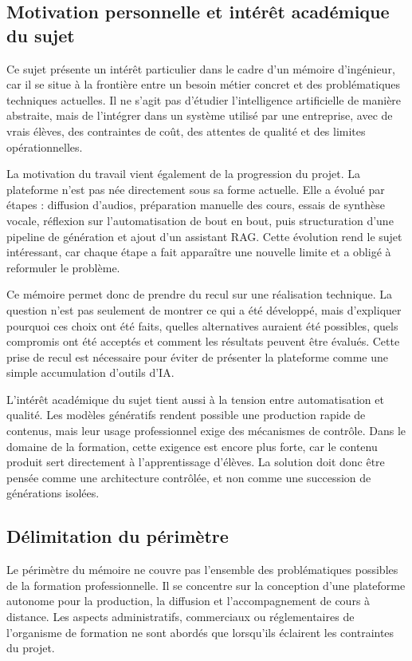 \subsection{Motivation personnelle et intérêt académique du sujet}

Ce sujet présente un intérêt particulier dans le cadre d'un mémoire d'ingénieur, car il se
situe à la frontière entre un besoin métier concret et des problématiques techniques
actuelles. Il ne s'agit pas d'étudier l'intelligence artificielle de manière abstraite, mais de
l'intégrer dans un système utilisé par une entreprise, avec de vrais élèves, des contraintes
de coût, des attentes de qualité et des limites opérationnelles.

La motivation du travail vient également de la progression du projet. La plateforme n'est
pas née directement sous sa forme actuelle. Elle a évolué par étapes : diffusion d'audios,
préparation manuelle des cours, essais de synthèse vocale, réflexion sur l'automatisation
de bout en bout, puis structuration d'une pipeline de génération et ajout d'un assistant
RAG. Cette évolution rend le sujet intéressant, car chaque étape a fait apparaître une
nouvelle limite et a obligé à reformuler le problème.

Ce mémoire permet donc de prendre du recul sur une réalisation technique. La question
n'est pas seulement de montrer ce qui a été développé, mais d'expliquer pourquoi ces
choix ont été faits, quelles alternatives auraient été possibles, quels compromis ont été
acceptés et comment les résultats peuvent être évalués. Cette prise de recul est
nécessaire pour éviter de présenter la plateforme comme une simple accumulation
d'outils d'IA.

L'intérêt académique du sujet tient aussi à la tension entre automatisation et qualité. Les
modèles génératifs rendent possible une production rapide de contenus, mais leur usage
professionnel exige des mécanismes de contrôle. Dans le domaine de la formation, cette
exigence est encore plus forte, car le contenu produit sert directement à l'apprentissage
d'élèves. La solution doit donc être pensée comme une architecture contrôlée, et non
comme une succession de générations isolées.

\subsection{Délimitation du périmètre}

Le périmètre du mémoire ne couvre pas l'ensemble des problématiques possibles de la
formation professionnelle. Il se concentre sur la conception d'une plateforme autonome
pour la production, la diffusion et l'accompagnement de cours à distance. Les aspects
administratifs, commerciaux ou réglementaires de l'organisme de formation ne sont
abordés que lorsqu'ils éclairent les contraintes du projet.

